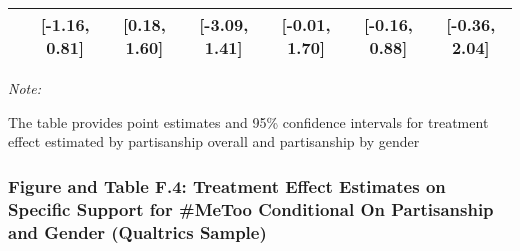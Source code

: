 \documentclass[
]{article}
\begin{document}
\begin{table}[H]
\begin{threeparttable}
\begin{tabular}[t]{lcccccc}
\hspace{1em} & {}[-1.16, 0.81] & {}[0.18, 1.60] & {}[-3.09, 1.41] & {}[-0.01, 1.70] & {}[-0.16, 0.88] & {}[-0.36, 2.04]\\
\bottomrule
\end{tabular}
\begin{tablenotes}
\small
\item \textit{Note: } 
\item The table provides point estimates and 95\% confidence intervals for treatment effect estimated by partisanship overall and partisanship by gender
\end{tablenotes}
\end{threeparttable}
\end{table}

\hypertarget{figure-and-table-f.4-treatment-effect-estimates-on-specific-support-for-metoo-conditional-on-partisanship-and-gender-qualtrics-sample}{%
\subsubsection{Figure and Table F.4: Treatment Effect Estimates on
Specific Support for \#MeToo Conditional On Partisanship and Gender
(Qualtrics
Sample)}\label{figure-and-table-f.4-treatment-effect-estimates-on-specific-support-for-metoo-conditional-on-partisanship-and-gender-qualtrics-sample}}
\end{document}
